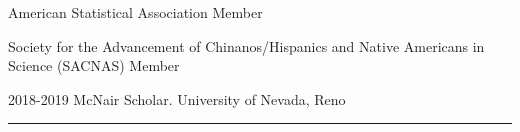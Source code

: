 \documentclass{article}
\begin{document}


\begin{description}
	\vspace{-2mm}
	\item[Programs and Professional Membership]\hspace*{.01in}
		
		American Statistical Association Member
		\vspace*{1mm}
		
		Society for the Advancement of Chinanos/Hispanics and Native Americans in Science (SACNAS) Member
		\vspace*{1mm}
		
		2018-2019 McNair Scholar. University of Nevada, Reno
		
\end{description}
\vspace{-2mm}
\rule{\linewidth}{1pt}



\end{document}
